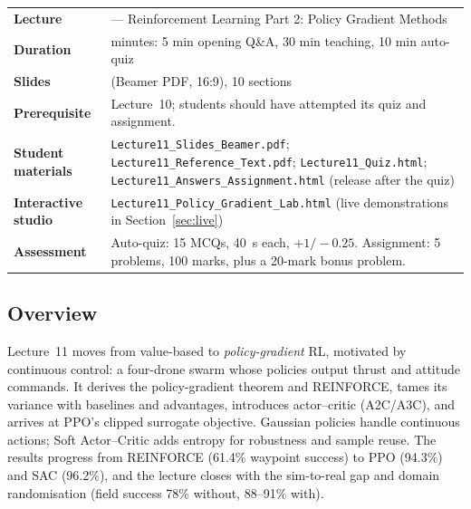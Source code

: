\documentclass[11pt]{article}
\begin{document}
\begin{center}\small\renewcommand{\arraystretch}{1.25}\begin{tabularx}{\textwidth}{@{}>{\bfseries}p{3.3cm}>{\raggedright\arraybackslash}X@{}}\toprule

\textcolor{NavyN}{Lecture}&11 --- Reinforcement Learning Part 2: Policy Gradient Methods\\
\textcolor{NavyN}{Duration}&45 minutes: 5 min opening Q\&A, 30 min teaching, 10 min auto-quiz\\
\textcolor{NavyN}{Slides}&19 (Beamer PDF, 16:9), 10 sections\\
\textcolor{NavyN}{Prerequisite}&Lecture~10; students should have attempted its quiz and assignment.\\
\textcolor{NavyN}{Student materials}&\texttt{Lecture11\_Slides\_Beamer.pdf}; \texttt{Lecture11\_Reference\_Text.pdf}; \texttt{Lecture11\_Quiz.html}; \texttt{Lecture11\_Answers\_Assignment.html} (release after the quiz)\\
\textcolor{NavyN}{Interactive studio}&\texttt{Lecture11\_Policy\_Gradient\_Lab.html} (live demonstrations in Section~\ref{sec:live})\\
\textcolor{NavyN}{Assessment}&Auto-quiz: 15 MCQs, 40~s each, $+1/-0.25$. Assignment: 5 problems, 100 marks, plus a 20-mark bonus problem.\\\bottomrule\end{tabularx}\end{center}

\subsection*{Overview}Lecture~11 moves from value-based to \emph{policy-gradient} RL, motivated by continuous control: a four-drone swarm whose policies output thrust and attitude commands. It derives the policy-gradient theorem and REINFORCE, tames its variance with baselines and advantages, introduces actor--critic (A2C/A3C), and arrives at PPO's clipped surrogate objective. Gaussian policies handle continuous actions; Soft Actor--Critic adds entropy for robustness and sample reuse. The results progress from REINFORCE (61.4\% waypoint success) to PPO (94.3\%) and SAC (96.2\%), and the lecture closes with the sim-to-real gap and domain randomisation (field success 78\% without, 88--91\% with).
\end{document}
